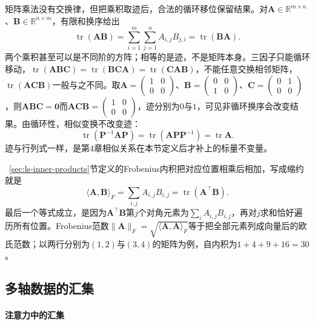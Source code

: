矩阵乘法没有交换律，但把乘积取迹后，合法的循环移位保留结果。对$\bm A\in\mathbb R^{m\times n}$、$\bm B\in\mathbb R^{n\times m}$，有限和换序给出
\begin{equation}
 \operatorname{tr}(\bm A\bm B)
 =\sum_{i=1}^m\sum_{j=1}^n A_{i,j}B_{j,i}
 =\operatorname{tr}(\bm B\bm A).
 \label{eq:linear-algebra-trace-cyclic}
\end{equation}
两个乘积甚至可以是不同阶的方阵；相等的是迹，不是矩阵本身。三因子只能循环移动，$\operatorname{tr}(\bm A\bm B\bm C)=\operatorname{tr}(\bm B\bm C\bm A)=\operatorname{tr}(\bm C\bm A\bm B)$，不能任意交换相邻矩阵，$\operatorname{tr}(\bm A\bm C\bm B)$一般与之不同。取$\bm A=\begin{pmatrix}1&0\\0&0\end{pmatrix}$、$\bm B=\begin{pmatrix}0&0\\1&0\end{pmatrix}$、$\bm C=\begin{pmatrix}0&1\\0&0\end{pmatrix}$，则$\bm A\bm B\bm C=\bm0$而$\bm A\bm C\bm B=\begin{pmatrix}1&0\\0&0\end{pmatrix}$，迹分别为$0$与$1$，可见非循环换序会改变结果。由循环性，相似变换不改变迹：
\[
 \operatorname{tr}(\bm P^{-1}\bm A\bm P)
 =\operatorname{tr}(\bm A\bm P\bm P^{-1})
 =\operatorname{tr}\bm A.
\]
迹与行列式一样，是第4章相似关系在本节定义后才补上的标量不变量。

~\ref{sec:ls-inner-products}节定义的Frobenius内积把对应位置相乘后相加，写成缩约就是
\[
 \langle\bm A,\bm B\rangle_F
 =\sum_{i,j}A_{i,j}B_{i,j}
 =\operatorname{tr}(\bm A^\top\bm B).
\]
最后一个等式成立，是因为$\bm A^\top\bm B$第$j$个对角元素为$\sum_i A_{i,j}B_{i,j}$，再对$j$求和恰好遍历所有位置。Frobenius范数$\lVert\bm A\rVert_F=\sqrt{\langle\bm A,\bm A\rangle_F}$等于把全部元素列成向量后的欧氏范数；以两行分别为$(1,2)$与$(3,4)$的矩阵为例，自内积为$1+4+9+16=30$。

\subsection{多轴数据的汇集}

\paragraph{注意力中的汇集}

